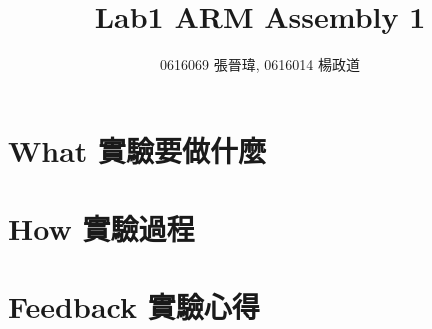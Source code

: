 \title{Lab1 ARM Assembly 1}
\author{0616069 張晉瑋, 0616014 楊政道}
\maketitle
\thispagestyle{fancy}
\section{What 實驗要做什麼}
\paragraph{}
\section{How 實驗過程}
\paragraph{}
\section{Feedback 實驗心得}
\paragraph{}
